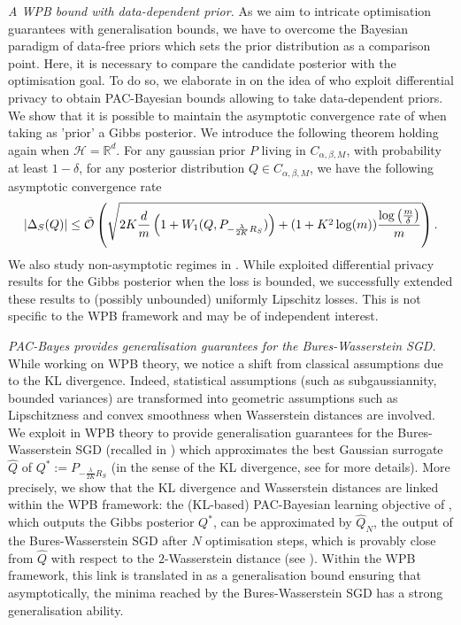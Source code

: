 \textit{A WPB bound with data-dependent prior.}
As we aim to intricate optimisation guarantees with generalisation bounds, we have to overcome the Bayesian paradigm of data-free priors which sets the prior distribution as a comparison point. Here, it is necessary to compare the candidate posterior with the optimisation goal. To do so, we elaborate in  on the idea of \citet{dziugaite2018data} who exploit differential privacy to obtain PAC-Bayesian bounds allowing to take data-dependent priors. We show that it is possible to maintain the asymptotic convergence rate of  when taking as 'prior' a Gibbs posterior.
We introduce the following theorem holding again when $\mathcal{H}=\mathbb{R}^d$. For any gaussian prior $P$ living in $C_{\alpha,\beta,M}$, with probability at least $1-\delta$, for any posterior distribution $Q\in C_{\alpha,\beta,M}$, we have the following asymptotic convergence rate
\begin{align*}
|\Delta_S(Q)|  \leq\Tilde{\mathcal{O}}\left( \sqrt{2K\frac{d}{m}\left(1 + W_1(Q,P_{-\frac{\lambda}{2K}R_S})\right)+(1+K^2\log(m))\frac{\log\left( \frac{m}{\delta} \right)}{m}}   \right).
\end{align*}
We also study non-asymptotic regimes in . While \citet{dziugaite2018data} exploited differential privacy results for the Gibbs posterior when the loss is bounded, we successfully extended these results to (possibly unbounded) uniformly Lipschitz losses. This is not specific to the WPB framework and may be of independent interest.

\textit{PAC-Bayes provides generalisation guarantees for the Bures-Wasserstein SGD.}
While working on WPB theory, we notice a shift from classical assumptions due to the KL divergence. Indeed, statistical assumptions (such as subgaussiannity, bounded variances) are transformed into geometric assumptions such as Lipschitzness and convex smoothness when Wasserstein distances are involved. We exploit in  WPB theory to provide generalisation guarantees for the Bures-Wasserstein SGD (recalled in ) which approximates the best Gaussian surrogate $\hat{Q}$ of $Q^*:= P_{-\frac{\lambda}{2K}R_S}$ (in the sense of the KL divergence, see  for more details).
More precisely, we show that the KL divergence and Wasserstein distances are linked within the WPB framework: the (KL-based) PAC-Bayesian learning objective of \citet{catoni2007pac}, which outputs the Gibbs posterior $Q^*$, can be approximated by $\hat{Q}_N$, the output of the Bures-Wasserstein SGD after $N$ optimisation steps, which is provably close from $\hat{Q}$ with respect to the $2$-Wasserstein distance (see ).
Within the WPB framework, this link is translated in  as a generalisation bound ensuring that asymptotically, the minima reached by the Bures-Wasserstein SGD has a strong generalisation ability.
\medskip

